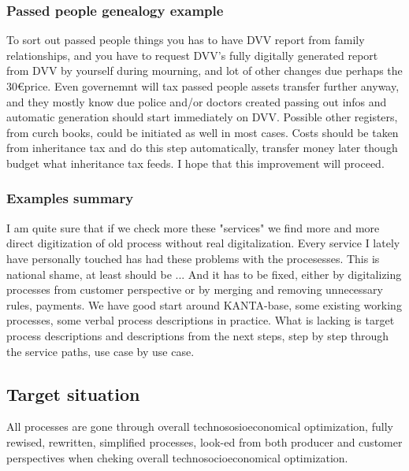 \subsubsection{Passed people genealogy example}
To sort out passed people things you has to have DVV report from family relationships,
and you have to request DVV's fully digitally generated report from DVV by yourself during mourning,
and lot of other changes due perhaps the 30\euro price.
Even governemnt will tax passed people assets transfer further anyway,
and they mostly know due police and/or doctors created passing out infos
and automatic generation should start immediately on DVV.
Possible other registers, from curch books, could be initiated as well in most cases.
Costs should be taken from inheritance tax and do this step automatically,
transfer money later though budget what inheritance tax feeds.
I hope that this improvement\cite{SukuselvitysPerukirja} will proceed.

\subsubsection{Examples summary}
I am quite sure that if we check more these "services" we find more and more
direct digitization of old process without real digitalization.
Every service I lately have personally touched has had these problems with the
procesesses. This is national shame, at least should
be \cite{Many_Stepwise_Rules_Leads_To_Mess}\-\cite{StudentHousingAllowance}\-\cite{ElakelaisetEivatTieda}...
And it has to be fixed, either by digitalizing processes from customer
perspective or by merging and removing unnecessary rules, payments.
We have good start around KANTA-base, some existing working processes, some
verbal process descriptions in practice. What is lacking is target process
descriptions and descriptions from the next steps, step by step through the
service paths, use case by use case\cite{LifeEventDetailDrivenProcessQuides}. 

\subsection{Target situation}
\label{target_situation}

All processes are gone through overall technososioeconomical optimization,
fully rewised, rewritten, simplified processes, look-ed from both producer and
customer perspectives when cheking overall technosocioeconomical optimization.

